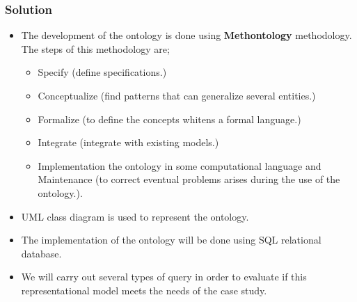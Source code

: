 \documentclass{beamer}
\begin{document}
\begin{frame}
	\frametitle{Solution}
	\begin{itemize}
		\item  The development of the ontology is done using \textbf{Methontology} methodology. The steps of this methodology are;
		\begin{itemize}
			\item Specify (define specifications.)
			\item Conceptualize (find patterns that can generalize several entities.)
			\item Formalize (to define the concepts whitens a formal language.)
			\item Integrate (integrate with existing models.)
			\item Implementation the ontology in some computational language and Maintenance (to correct eventual problems arises during the use of the ontology.).
		\end{itemize}
		\item UML class diagram is used to represent the ontology.
		\item The implementation of the ontology will be done using SQL relational database.
		\item We will carry out several types of query in order to evaluate if this representational model meets the needs of the case study.
	\end{itemize}
\end{frame}
\end{document}
